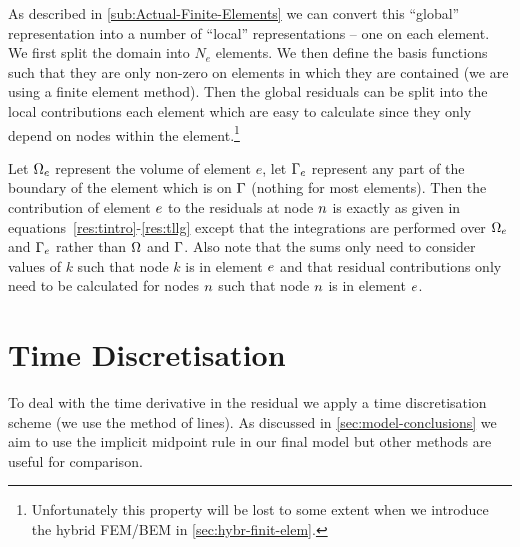 
As described in \autoref{sub:Actual-Finite-Elements} we can convert this ``global'' representation into a number of ``local'' representations -- one on each element. We first split the domain into $N_e$ elements. We then define the basis functions such that they are only non-zero on elements in which they are contained (\ie we are using a finite element method). Then the global residuals can be split into the local contributions each element which are easy to calculate since they only depend on nodes within the element.\footnote{Unfortunately this property will be lost to some extent when we introduce the hybrid FEM/BEM in \autoref{sec:hybr-finit-elem}.}

Let $\Omega_e$ represent the volume of element $e$, let ${\Gamma}_e$ represent any part of the boundary of the element which is on ${\Gamma}$ (nothing for most elements). Then the contribution of element $e$ to the residuals at node $n$ is exactly as given in equations~\eqref{res:tintro}-\eqref{res:tllg} except that the integrations are performed over $\Omega_e$ and ${\Gamma}_e$ rather than $\Omega$ and ${\Gamma}$. Also note that the sums only need to consider values of $k$ such that node $k$ is in element $e$ and that residual contributions only need to be calculated for nodes $n$ such that node $n$ is in element $e$.


\section{Time Discretisation}
\label{sec:time-discretisation-resi}

To deal with the time derivative in the residual we apply a time discretisation scheme (\ie we use the method of lines). As discussed in \autoref{sec:model-conclusions} we aim to use the implicit midpoint rule in our final model but other methods are useful for comparison.

